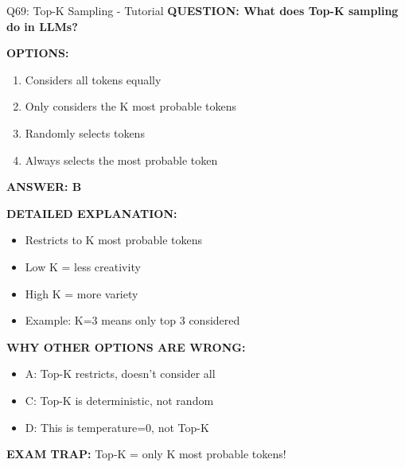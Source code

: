 \documentclass[8pt]{beamer}
\begin{document}
	\begin{frame}{Q69: Top-K Sampling - Tutorial}
		\fontsize{6.5}{7.5}\selectfont
		\textbf{QUESTION: What does Top-K sampling do in LLMs?}
		
		\vspace{0.1cm}
		\textbf{OPTIONS:}
		\begin{enumerate}
			\item Considers all tokens equally
			\item Only considers the K most probable tokens
			\item Randomly selects tokens
			\item Always selects the most probable token
		\end{enumerate}
		
		\vspace{0.1cm}
		\textcolor{myblue}{\textbf{ANSWER: B}}
		
		\vspace{0.1cm}
		\textbf{DETAILED EXPLANATION:}
		\begin{itemize}
			\item Restricts to K most probable tokens
			\item Low K = less creativity
			\item High K = more variety
			\item Example: K=3 means only top 3 considered
		\end{itemize}
		
		\vspace{0.1cm}
		\textcolor{myred}{\textbf{WHY OTHER OPTIONS ARE WRONG:}}
		\begin{itemize}
			\item \textcolor{myred}{A:} Top-K restricts, doesn't consider all
			\item \textcolor{myred}{C:} Top-K is deterministic, not random
			\item \textcolor{myred}{D:} This is temperature=0, not Top-K
		\end{itemize}
		
		\textcolor{myred}{\textbf{EXAM TRAP:}} Top-K = \textcolor{myblue}{only K most probable tokens}!
	\end{frame}
	
\end{document}
